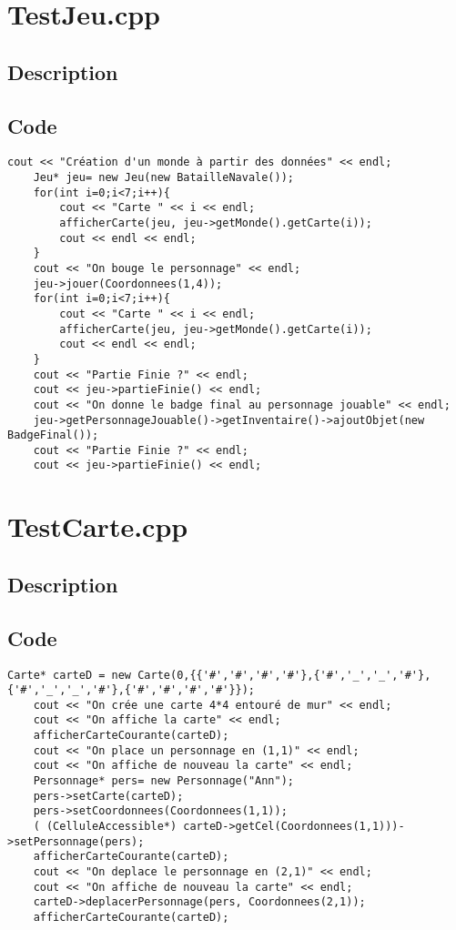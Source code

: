 \section{TestJeu.cpp}
        \subsection{Description}
            







        \subsection{Code}
\begin{lstlisting}
cout << "Création d'un monde à partir des données" << endl;
	Jeu* jeu= new Jeu(new BatailleNavale());
	for(int i=0;i<7;i++){
		cout << "Carte " << i << endl;
		afficherCarte(jeu, jeu->getMonde().getCarte(i));
		cout << endl << endl;
	}
	cout << "On bouge le personnage" << endl;
	jeu->jouer(Coordonnees(1,4));
	for(int i=0;i<7;i++){
		cout << "Carte " << i << endl;
		afficherCarte(jeu, jeu->getMonde().getCarte(i));
		cout << endl << endl;
	}
	cout << "Partie Finie ?" << endl;
	cout << jeu->partieFinie() << endl;
	cout << "On donne le badge final au personnage jouable" << endl;
	jeu->getPersonnageJouable()->getInventaire()->ajoutObjet(new BadgeFinal());
	cout << "Partie Finie ?" << endl;
	cout << jeu->partieFinie() << endl;
	\end{lstlisting}
\section{TestCarte.cpp}
        \subsection{Description}
            








        \subsection{Code}
\begin{lstlisting}
Carte* carteD = new Carte(0,{{'#','#','#','#'},{'#','_','_','#'},{'#','_','_','#'},{'#','#','#','#'}});
	cout << "On crée une carte 4*4 entouré de mur" << endl;
	cout << "On affiche la carte" << endl;
	afficherCarteCourante(carteD);
	cout << "On place un personnage en (1,1)" << endl;
	cout << "On affiche de nouveau la carte" << endl;
	Personnage* pers= new Personnage("Ann");
	pers->setCarte(carteD);
	pers->setCoordonnees(Coordonnees(1,1));
	( (CelluleAccessible*) carteD->getCel(Coordonnees(1,1)))->setPersonnage(pers);
	afficherCarteCourante(carteD);
	cout << "On deplace le personnage en (2,1)" << endl;
	cout << "On affiche de nouveau la carte" << endl;
	carteD->deplacerPersonnage(pers, Coordonnees(2,1));
	afficherCarteCourante(carteD);
	\end{lstlisting}
